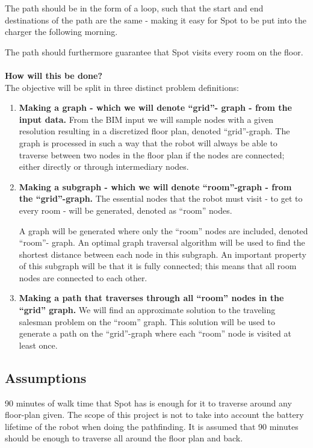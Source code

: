 The path should be in the form of a loop, such that the start and end destinations of the path are the same - making it easy for Spot to be put into the charger the following morning.

The path should furthermore guarantee that Spot visits every room on the floor.
\\\\
\textbf{How will this be done?}
\\
The objective will be split in three distinct problem definitions:
\begin{enumerate}
    \item \textbf{Making a graph - which we will denote “grid”- graph - from the input data.} From the BIM input we will sample nodes with a given resolution resulting in a discretized floor plan, denoted “grid”-graph. %
    The graph is processed in such a way that the robot will always be able to traverse between two nodes in the floor plan if the nodes are connected; either directly or through intermediary nodes.
    
    \item \textbf{Making a subgraph - which we will denote “room”-graph - from the “grid”-graph.}
    The essential nodes that the robot must visit - to get to every room - will be generated, denoted as “room” nodes.

    A graph will be generated where only the “room” nodes are included, denoted “room”- graph.
    An optimal graph traversal algorithm will be used to find the shortest distance between each node in this subgraph. An important property of this subgraph will be that it is fully connected; this means that all room nodes are connected to each other.

    
    \item \textbf{Making a path that traverses through all “room” nodes in the “grid” graph.} We will find an approximate solution to the traveling salesman problem on the “room” graph. This solution will be used to generate a path on the “grid”-graph where each “room” node is visited at least once.
\end{enumerate}


\subsection{Assumptions}
90 minutes of walk time that Spot has is enough for it to traverse around any floor-plan given. The scope of this project is not to take into account the battery lifetime of the robot when doing the pathfinding. It is assumed that 90 minutes should be enough to traverse all around the floor plan and back. 

